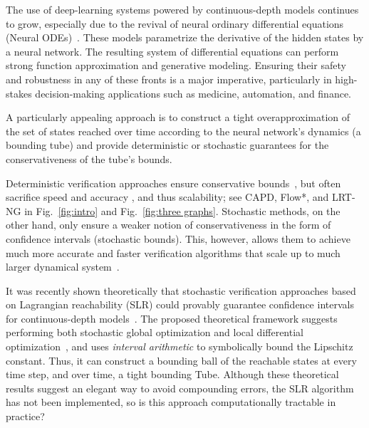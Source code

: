 \documentclass[letterpaper]{article} %
\begin{document}
The use of deep-learning systems powered by con\-tin\-u\-ous-depth models continues to grow, especially due to the revival of neural ordinary differential equations (Neural ODEs)~\cite{neuralODEs}. These models parametrize the derivative of the hidden states by a neural network. The resulting system of differential equations can perform strong function approximation and generative modeling. Ensuring their safety and robustness in any of these fronts is a major imperative, particularly in high-stakes decision-making applications such as medicine, automation, and finance.

A particularly appealing approach is to construct a tight overapproximation of the set of states reached over time according to the neural network's dynamics (a bounding tube) and provide deterministic %
or stochastic %
guarantees for the conservativeness of the tube's bounds.

Deterministic verification approaches ensure conservative bounds~\cite{flowstar,gowal2018effectiveness,mirman2018differentiable,bunel2020lagrangian,capd,gruenbacher2020lagrangian}, but often sacrifice speed and accuracy \cite{ehlers2017formal}, and thus scalability; see CAPD, Flow*, and LRT-NG in Fig.~\ref{fig:intro} and Fig.~\ref{fig:three graphs}. Stochastic methods, on the other hand, only ensure a weaker notion of conservativeness in the form of confidence intervals (stochastic bounds).  This, however, allows them to achieve much more accurate and faster verification algorithms that scale up to much larger dynamical system~\cite{probreach,gp,Gruenbacher2021verification}.

It was recently shown theoretically that stochastic verification approaches based on Lagrangian reachability (SLR) could provably guarantee confidence intervals for continuous-depth models~\cite{Gruenbacher2021verification}. The proposed theoretical framework suggests performing both stochastic global optimization and local differential optimization~\cite{stochGlobOptim, pontryagin2018mathematical}, and uses \emph{interval arithmetic} to symbolically bound the Lipschitz constant. Thus, it can construct a bounding ball of the reachable states at every time step, and over time, a tight bounding Tube. Although these theoretical results suggest an elegant way to avoid compounding errors, the SLR algorithm has not been implemented, so is this approach computationally tractable in practice?
\end{document}
